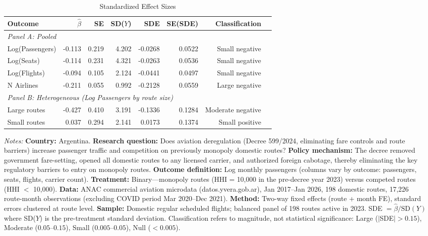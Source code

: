 \begin{table}[t]
\centering
\caption{Standardized Effect Sizes}
\label{tab:sde}
\small
\begin{tabular}{lrrrrrrl}
\toprule
Outcome & $\hat{\beta}$ & SE & SD($Y$) & SDE & SE(SDE) & Classification \\
\midrule
\multicolumn{7}{l}{\textit{Panel A: Pooled}} \\
Log(Passengers) & -0.113 & 0.219 & 4.202 & -0.0268 & 0.0522 & Small negative \\
Log(Seats) & -0.114 & 0.231 & 4.321 & -0.0263 & 0.0536 & Small negative \\
Log(Flights) & -0.094 & 0.105 & 2.124 & -0.0441 & 0.0497 & Small negative \\
N Airlines & -0.211 & 0.055 & 0.992 & -0.2128 & 0.0559 & Large negative \\
\midrule
\multicolumn{7}{l}{\textit{Panel B: Heterogeneous (Log Passengers by route size)}} \\
Large routes & -0.427 & 0.410 & 3.191 & -0.1336 & 0.1284 & Moderate negative \\
Small routes & 0.037 & 0.294 & 2.141 & 0.0173 & 0.1374 & Small positive \\
\bottomrule
\end{tabular}
\begin{tablenotes}
\item \textit{Notes:} \textbf{Country:} Argentina. \textbf{Research question:} Does aviation deregulation (Decree 599/2024, eliminating fare controls and route barriers) increase passenger traffic and competition on previously monopoly domestic routes? \textbf{Policy mechanism:} The decree removed government fare-setting, opened all domestic routes to any licensed carrier, and authorized foreign cabotage, thereby eliminating the key regulatory barriers to entry on monopoly routes. \textbf{Outcome definition:} Log monthly passengers (columns vary by outcome: passengers, seats, flights, carrier count). \textbf{Treatment:} Binary---monopoly routes (HHI = 10,000 in the pre-decree year 2023) versus competed routes (HHI $<$ 10,000). \textbf{Data:} ANAC commercial aviation microdata (datos.yvera.gob.ar), Jan 2017--Jan 2026, 198 domestic routes, 17,226 route-month observations (excluding COVID period Mar 2020--Dec 2021). \textbf{Method:} Two-way fixed effects (route + month FE), standard errors clustered at route level. \textbf{Sample:} Domestic regular scheduled flights; balanced panel of 198 routes active in 2023. SDE $= \hat{\beta} / \text{SD}(Y)$ where SD($Y$) is the pre-treatment standard deviation. Classification refers to magnitude, not statistical significance: Large ($|$SDE$| > 0.15$), Moderate ($0.05$--$0.15$), Small ($0.005$--$0.05$), Null ($< 0.005$).
\end{tablenotes}
\end{table}
